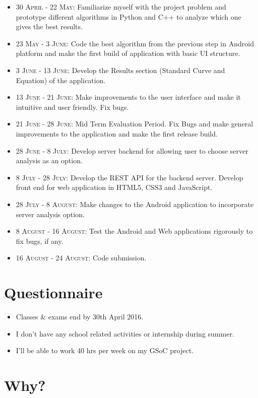 \documentclass[runningheads,a4paper]{llncs}
\begin{document}
\begin{itemize}
\item \textsc{30 April - 22 May}: Familiarize myself with the project problem and prototype different algorithms in Python and C++ to analyze which one gives the best results.
\item \textsc{23 May - 3 June}: Code the best algorithm from the previous step in Android platform and make the first build of application with basic UI structure.
\item \textsc{3 June - 13 June}: Develop the Results section (Standard Curve and Equation) of the application.
\item \textsc{13 June - 21 June}: Make improvements to the user interface and make it intuitive and user friendly. Fix bugs.
\item \textsc{21 June - 28 June}: Mid Term Evaluation Period. Fix Bugs and make general improvements to the application and make the first release build.
\item \textsc{28 June - 8 July}: Develop server backend for allowing user to choose server analysis as an option. 
\item \textsc{8 July - 28 July}: Develop the REST API for the backend server. Develop front end for web application in HTML5, CSS3 and JavaScript.
\item \textsc{28 July - 8 August}: Make changes to the Android application to incorporate server analysis option.
\item \textsc{8 August - 16 August}: Test the Android and Web applications rigorously to fix bugs, if any.
\item \textsc{16 August - 24 August}: Code submission.

\end{itemize}

\section{Questionnaire}

\begin{itemize}
\item Classes \& exams end by 30th April 2016.
\item I don't have any school related activities or internship during summer.
\item I'll be able to work 40 hrs per week on my GSoC project.

\end{itemize}

\section{Why?}
\end{document}
